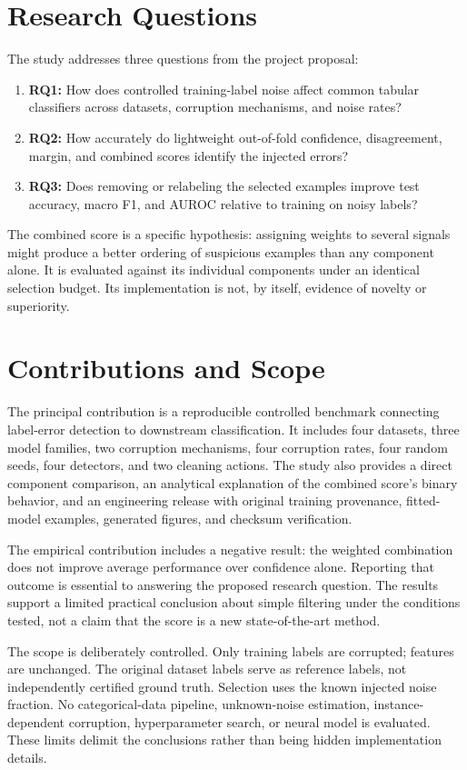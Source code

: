 \section{Research Questions}
The study addresses three questions from the project proposal:
\begin{enumerate}
\item \textbf{RQ1:} How does controlled training-label noise affect common
tabular classifiers across datasets, corruption mechanisms, and noise rates?
\item \textbf{RQ2:} How accurately do lightweight out-of-fold confidence,
disagreement, margin, and combined scores identify the injected errors?
\item \textbf{RQ3:} Does removing or relabeling the selected examples improve
test accuracy, macro F1, and AUROC relative to training on noisy labels?
\end{enumerate}
The combined score is a specific hypothesis: assigning weights to several
signals might produce a better ordering of suspicious examples than any
component alone. It is evaluated against its individual components under an
identical selection budget. Its implementation is not, by itself, evidence
of novelty or superiority.

\section{Contributions and Scope}
The principal contribution is a reproducible controlled benchmark connecting
label-error detection to downstream classification. It includes four datasets,
three model families, two corruption mechanisms, four corruption rates, four
random seeds, four detectors, and two cleaning actions. The study also provides
a direct component comparison, an analytical explanation of the combined
score's binary behavior, and an engineering release with original training
provenance, fitted-model examples, generated figures, and checksum verification.

The empirical contribution includes a negative result: the weighted combination
does not improve average performance over confidence alone. Reporting that
outcome is essential to answering the proposed research question. The results
support a limited practical conclusion about simple filtering under the
conditions tested, not a claim that the score is a new state-of-the-art method.

The scope is deliberately controlled. Only training labels are corrupted;
features are unchanged. The original dataset labels serve as reference labels,
not independently certified ground truth. Selection uses the known injected
noise fraction. No categorical-data pipeline, unknown-noise estimation,
instance-dependent corruption, hyperparameter search, or neural model is
evaluated. These limits delimit the conclusions rather than being hidden
implementation details.

